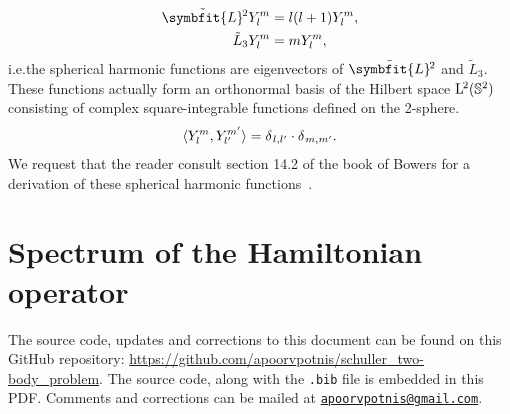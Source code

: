 \documentclass[12pt, a4 paper]{article}
\theoremstyle{definition}
\newcommand{\lvecsquare}{\tilde{\symbfit{L}}\kern-1pt^2}
\begin{document}
	\begin{align*}
	    \lvecsquare Y_l^m &= l(l+1) Y_l^m,\\
		\tilde{L}_3 Y_l^m &= m Y_l^m,
	\end{align*}
	i.e.\@ the spherical harmonic functions are eigenvectors of $\lvecsquare$ and $\tilde{L}_3$. These functions actually form an orthonormal basis of the Hilbert space $\mathrm{L}\kern-0.7pt^2(\mathbb{S}^2)$ consisting of complex square-integrable functions defined on the 2-sphere.
	\begin{align*}
		\langle Y_l^m , Y_{l'}^{m'} \rangle = \delta\kern0.5pt_{l, l'}\cdot\delta\kern0.4pt_{m, m'}.
	\end{align*}
	We request that the reader consult section 14.2 of the book of Bowers for a derivation of these spherical harmonic functions~\cite[p.~200]{Bowers}.

	\section{Spectrum of the Hamiltonian operator}















%

	\nocite{*}
	\printbibliography[heading=bibintoc]

	\par\begin{spacing}{0.6}
		{\footnotesize The source code, updates and corrections to this document can be found on this GitHub repository: \url{https://github.com/apoorvpotnis/schuller_two-body_problem}. The source code, along with the \texttt{.bib} file is embedded in this PDF. Comments and corrections can be mailed at \href{mailto:apoorvpotnis@gmail.com}{\texttt{apoorvpotnis@gmail.com}}.}
	\end{spacing}
\end{document}
